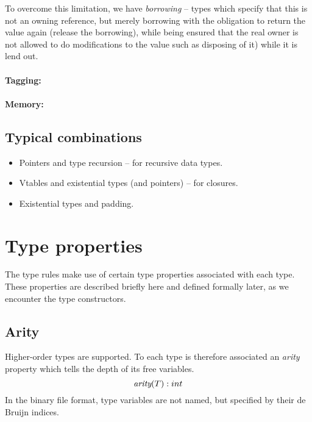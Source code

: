 \documentclass[a4paper]{report}
\newcommand\arity{{\ensuremath\textit{arity}}}
\begin{document}
To overcome this limitation, we have \emph{borrowing} -- types which
specify that this is not an owning reference, but merely borrowing
with the obligation to return the value again (release the borrowing),
while being ensured that the real owner is not allowed to do
modifications to the value such as disposing of it) while it is lend
out.


\paragraph{Tagging:}

\paragraph{Memory:}


\subsection{Typical combinations}
\begin{itemize}
\item Pointers and type recursion -- for recursive data types.
\item Vtables and existential types (and pointers) -- for closures.
\item Existential types and padding.
\end{itemize}



\section{Type properties}

The type rules make use of certain type properties associated with each type.
These properties are described briefly here and defined formally later,
as we encounter the type constructors.

\subsection{Arity}
Higher-order types are supported. To each type is therefore associated
an \emph{arity} property which tells the depth of its free variables.
$$
\arity(T) : int
$$
In the binary file format, type variables are not named, but specified
by their de Bruijn indices.
\end{document}
